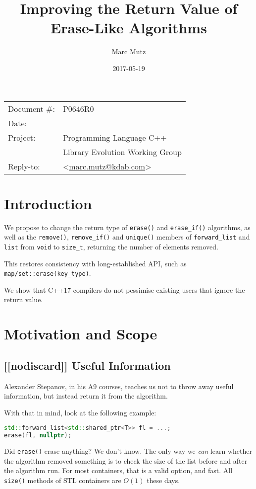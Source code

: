 \documentclass[11pt]{article}
\date{}
\title{Improving the Return Value of Erase-Like Algorithms}
\makeatletter
\newcommand{\emailaddress}{marc.mutz@kdab.com}
\newcommand{\email}{\href{mailto:\emailaddress}{\emailaddress}}
\makeatother
\begin{document}
\maketitle\vspace{-2cm}

\begin{flushright}
  \begin{tabular}{ll}
  Document \#:&P0646R0\\
  Date:       &\date{2017-05-19}\\
  Project:    &Programming Language C++\\
              &Library Evolution Working Group\\
  Reply-to:   &\author{Marc Mutz} \textless\email\textgreater
  \end{tabular}
\end{flushright}

\section{Introduction}

We propose to change the return type of \cite{LFv2TS} \texttt{erase()}
and \texttt{erase\_if()} algorithms, as well as the \texttt{remove()},
\texttt{remove\_if()} and \texttt{unique()} members of
\texttt{forward\_list} and \texttt{list} from \texttt{void} to
\texttt{size\_t}, returning the number of elements removed.

This restores consistency with long-established API, such as
\texttt{map/set::erase(key\_type)}.

We show that C++17 compilers do not pessimise existing users that
ignore the return value.

\section{Motivation and Scope}

\subsection{[[nodiscard]] Useful Information}

Alexander Stepanov, in his A9 courses\cite{A9}, teaches us not to
throw away useful information, but instead return it from the
algorithm.

With that in mind, look at the following example:
\begin{lstlisting}[language=C++]
std::forward_list<std::shared_ptr<T>> fl = ...;
erase(fl, nullptr);
\end{lstlisting}
Did \texttt{erase()} erase anything? We don't know. The only way we
\emph{can} learn whether the algorithm removed something is to check
the size of the list before and after the algorithm run. For most
containers, that is a valid option, and fast. All \texttt{size()}
methods of STL containers are $O(1)$ these days.
\end{document}
